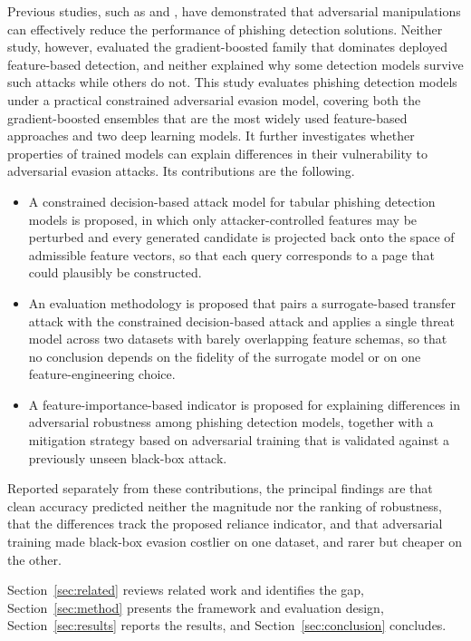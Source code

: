 \documentclass[runningheads]{llncs}
\begin{document}
Previous studies, such as \cite{apruzzese2022} and \cite{montaruli2023}, have
demonstrated that adversarial manipulations can effectively reduce the
performance of phishing detection solutions. Neither study, however, evaluated
the gradient-boosted family that dominates deployed feature-based detection, and
neither explained why some detection models survive such attacks while others do
not. This study evaluates phishing detection models under a practical constrained
adversarial evasion model, covering both the gradient-boosted ensembles that are
the most widely used feature-based approaches and two deep learning models. It
further investigates whether properties of trained models can explain differences in their vulnerability to adversarial evasion attacks. Its contributions are the following.

\begin{itemize}
\item A constrained decision-based attack model for tabular phishing detection
models is proposed, in which only attacker-controlled features may be perturbed
and every generated candidate is projected back onto the space of admissible
feature vectors, so that each query corresponds to a page that could plausibly
be constructed.
\item An evaluation methodology is proposed that pairs a surrogate-based transfer
attack with the constrained decision-based attack and applies a single threat
model across two datasets with barely overlapping feature schemas, so that no conclusion
depends on the fidelity of the surrogate model or on one feature-engineering
choice.
\item A feature-importance-based indicator is proposed for explaining differences
in adversarial robustness among phishing detection models, together with a
mitigation strategy based on adversarial training that is validated against a
previously unseen black-box attack.
\end{itemize}

Reported separately from these contributions, the principal findings are that
clean accuracy predicted neither the magnitude nor the ranking of robustness,
that the differences track the proposed reliance indicator, and that adversarial training made black-box evasion costlier on one dataset,
and rarer but cheaper on the other.

Section~\ref{sec:related} reviews related work and identifies the gap,
Section~\ref{sec:method} presents the framework and evaluation design,
Section~\ref{sec:results} reports the results, and Section~\ref{sec:conclusion}
concludes.
\end{document}
